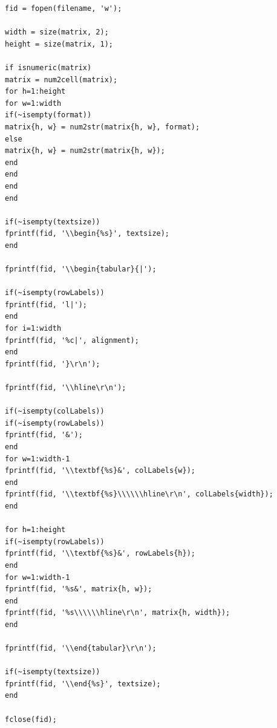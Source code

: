 \documentclass[10pt]{article}
\begin{document}
\begin{lstlisting}
fid = fopen(filename, 'w');

width = size(matrix, 2);
height = size(matrix, 1);

if isnumeric(matrix)
matrix = num2cell(matrix);
for h=1:height
for w=1:width
if(~isempty(format))
matrix{h, w} = num2str(matrix{h, w}, format);
else
matrix{h, w} = num2str(matrix{h, w});
end
end
end
end

if(~isempty(textsize))
fprintf(fid, '\\begin{%s}', textsize);
end

fprintf(fid, '\\begin{tabular}{|');

if(~isempty(rowLabels))
fprintf(fid, 'l|');
end
for i=1:width
fprintf(fid, '%c|', alignment);
end
fprintf(fid, '}\r\n');

fprintf(fid, '\\hline\r\n');

if(~isempty(colLabels))
if(~isempty(rowLabels))
fprintf(fid, '&');
end
for w=1:width-1
fprintf(fid, '\\textbf{%s}&', colLabels{w});
end
fprintf(fid, '\\textbf{%s}\\\\\\hline\r\n', colLabels{width});
end

for h=1:height
if(~isempty(rowLabels))
fprintf(fid, '\\textbf{%s}&', rowLabels{h});
end
for w=1:width-1
fprintf(fid, '%s&', matrix{h, w});
end
fprintf(fid, '%s\\\\\\hline\r\n', matrix{h, width});
end

fprintf(fid, '\\end{tabular}\r\n');

if(~isempty(textsize))
fprintf(fid, '\\end{%s}', textsize);
end

fclose(fid);
\end{lstlisting}
\end{document}
